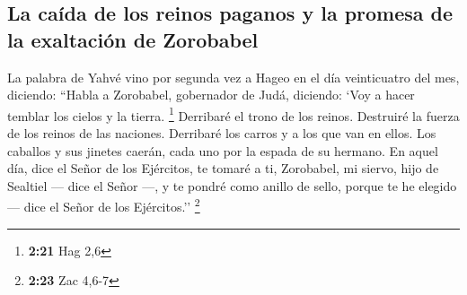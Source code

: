 \hypertarget{la-cauxedda-de-los-reinos-paganos-y-la-promesa-de-la-exaltaciuxf3n-de-zorobabel}{%
\subsection{La caída de los reinos paganos y la promesa de la exaltación
de
Zorobabel}\label{la-cauxedda-de-los-reinos-paganos-y-la-promesa-de-la-exaltaciuxf3n-de-zorobabel}}

 La palabra de Yahvé vino por segunda vez a Hageo en el
día veinticuatro del mes, diciendo:  ``Habla a Zorobabel,
gobernador de Judá, diciendo: `Voy a hacer temblar los cielos y la
tierra. \footnote{\textbf{2:21} Hag 2,6}  Derribaré el
trono de los reinos. Destruiré la fuerza de los reinos de las naciones.
Derribaré los carros y a los que van en ellos. Los caballos y sus
jinetes caerán, cada uno por la espada de su hermano.  En
aquel día, dice el Señor de los Ejércitos, te tomaré a ti, Zorobabel, mi
siervo, hijo de Sealtiel --- dice el Señor ---, y te pondré como anillo
de sello, porque te he elegido --- dice el Señor de los Ejércitos.''
\footnote{\textbf{2:23} Zac 4,6-7}
